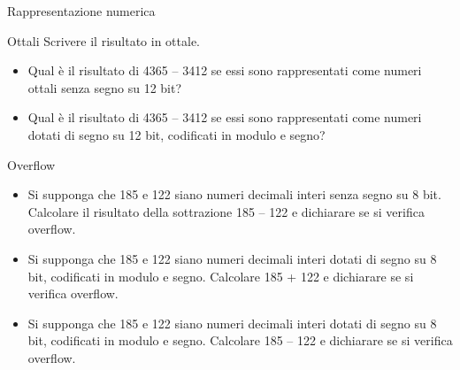 \documentclass[11pt]{article}
\begin{document}
\begin{quiz}{Rappresentazione numerica}
\begin{cloze}[points=1,shuffle=false]{Ottali}
Scrivere il risultato in ottale.
\begin{itemize}
\item Qual è il risultato di 4365 – 3412 se essi sono rappresentati come numeri ottali senza segno su 12 bit? 
    \item Qual è il risultato di 4365 – 3412 se essi sono rappresentati come numeri dotati di segno su 12 bit, codificati in modulo e segno? 
\end{itemize}
\end{cloze}

\begin{cloze}[points=1,shuffle=false]{Overflow}
\begin{itemize}
\item Si supponga che 185 e 122 siano numeri decimali interi senza segno su 8 bit. Calcolare il risultato della sottrazione 185 – 122 e dichiarare se si verifica overflow. 
\item Si supponga che 185 e 122 siano numeri decimali interi dotati di segno su 8 bit, codificati in modulo e segno. Calcolare 185 + 122 e dichiarare se si verifica overflow. 
\item Si supponga che 185 e 122 siano numeri decimali interi dotati di segno su 8 bit, codificati in modulo e segno. Calcolare 185 – 122 e dichiarare se si verifica overflow.
\end{itemize}
\end{cloze}


\end{quiz}
\end{document}
